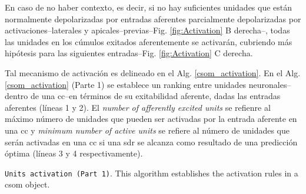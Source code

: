 {En caso de no haber contexto, es decir, si no hay suficientes unidades que están normalmente depolarizadas por entradas aferentes
parcialmente depolarizadas por activaciones--laterales y apicales--previas--Fig. \ref{fig:Activation} B derecha--,
todas las unidades en los cúmulos exitados aferentemente se activarán, cubriendo más hipótesis para las siguientes entradas--Fig. \ref{fig:Activation} C derecha.

Tal mecanismo de activación es delineado en el Alg. \ref{csom_activation}. En el Alg. \ref{csom_activation} (Parte 1) se establece un ranking entre unidades neuronales--dentro de una \gls{cc}--en términos de su exitabilidad aferente, dadas las entradas aferentes (líneas 1 y 2).
El \emph{number of afferently excited units} se refienre al máximo número de unidades que pueden ser activadas por la entrada aferente en una \gls{cc} y \emph{minimum number of active units} se refiere al número de unidades que serán activadas en una \gls{cc} si una \gls{sdr} se alcanza como resultado de una predicción óptima (líneas 3 y 4 respectivamente).

\begin{algorithm}
	\caption{\texttt{Units activation (Part 1)}. This algorithm establishes the activation rules in a \gls{csom} object.}
\label{csom_activation}
\begin{algorithmic}[1]




	\ELSE
	\ENDIF


\end{algorithmic}
\end{algorithm}}
